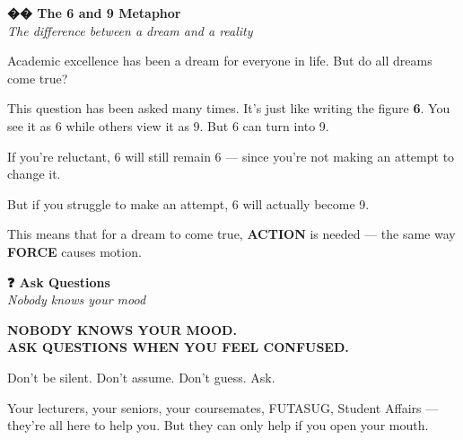 \documentclass[11pt,a4paper]{article}
\begin{document}
\begin{mindsetbox}
    \textbf{\color{primary}\Large �� The 6 and 9 Metaphor}\\[0.3em]
    {\color{textGray}\itshape The difference between a dream and a reality}

    \vspace{1em}

    Academic excellence has been a dream for everyone in life. But do all dreams come true?

    \vspace{0.5em}

    This question has been asked many times. It's just like writing the figure \textbf{6}. You see it as 6 while others view it as 9. But 6 can turn into 9.

    \vspace{0.5em}

    \begin{inspirational}
        If you're reluctant, 6 will still remain 6 --- since you're not making an attempt to change it.

        \vspace{0.5em}

        But if you struggle to make an attempt, 6 will actually become 9.
    \end{inspirational}

    \vspace{0.5em}

    This means that for a dream to come true, \textbf{ACTION} is needed --- the same way \textbf{FORCE} causes motion.
\end{mindsetbox}

\begin{mindsetbox}
    \textbf{\color{primary}\Large ❓ Ask Questions}\\[0.3em]
    {\color{textGray}\itshape Nobody knows your mood}

    \vspace{1em}

    \begin{center}
        {\color{dangerRed}\Large\bfseries NOBODY KNOWS YOUR MOOD.}\\[0.3em]
        {\color{dangerRed}\Large\bfseries ASK QUESTIONS WHEN YOU FEEL CONFUSED.}
    \end{center}

    \vspace{1em}

    Don't be silent. Don't assume. Don't guess. Ask.

    \vspace{0.5em}

    Your lecturers, your seniors, your coursemates, FUTASUG, Student Affairs --- they're all here to help you. But they can only help if you open your mouth.
\end{mindsetbox}
\end{document}
